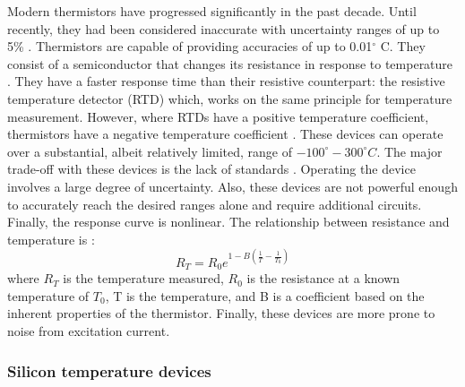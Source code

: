 Modern thermistors have progressed significantly in the past decade. Until recently, they had been considered inaccurate with uncertainty ranges of up to 5\% \cite{tong2001improving}. Thermistors are capable of providing accuracies of up to 0.01$^\circ$ C. They consist of a semiconductor that changes its resistance in response to temperature \cite{childs2000review}. They have a faster response time than their resistive counterpart: the resistive temperature detector (RTD) which, works on the same principle for temperature measurement. However, where RTDs have a positive temperature coefficient, thermistors have a negative temperature coefficient \cite{tong2001improving}. These devices can operate over a substantial, albeit relatively limited, range of $-100^\circ - 300^\circ C$. The major trade-off with these devices is the lack of standards \cite{tong2001improving}. Operating the device involves a large degree of uncertainty. Also, these devices are not powerful enough to accurately reach the desired ranges alone and require additional circuits. Finally, the response curve is nonlinear. The  relationship between resistance and temperature is \cite{childs2000review}:
\begin{equation}
	R_T = R_0e^{1 - B(\frac{1}{T}- \frac{1}{T_0})}
\end{equation}
where $R_T$ is the temperature measured, $R_0$ is the resistance at a known temperature of $T_0$, T is the temperature, and B is a coefficient based on the inherent properties of the thermistor. Finally, these devices are more prone to noise from excitation current.

\subsubsection{Silicon temperature devices}

